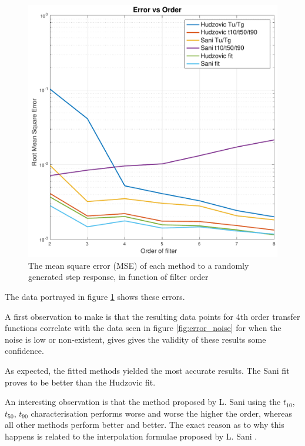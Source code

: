 \begin{figure}
    \includegraphics[width=\linewidth]{images/error_order}
    \caption{The mean square error (MSE) of each method to a randomly generated step response, in function of filter order}
    \label{fig:error_order}
\end{figure}

The data portrayed in figure \ref{fig:error_order} shows these errors.

A first observation to make is that the  resulting  data  points  for  4th order
transfer  functions correlate with the data seen in figure \ref{fig:error_noise}
for when the noise is low  or  non-existent,  gives  gives the validity of these
results some confidence.

As expected, the fitted methods  yielded the most accurate results. The Sani fit
proves  to be better than the Hudzovic fit.

An interesting observation is that the method proposed by L. Sani\cite{ref:sani}
using the $t_{10}$, $t_{50}$, $t_{90}$ characterisation performs worse and worse
the  higher  the order, whereas all other methods perform better and better. The
exact reason as to why this happens is related  to  the interpolation formulae proposed by L. Sani  .

